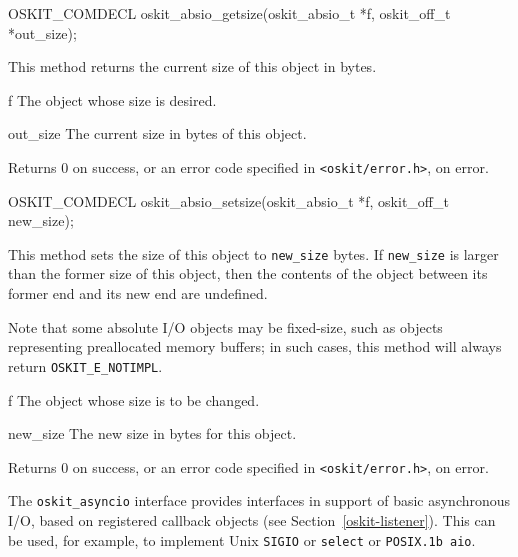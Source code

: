 \begin{apisyn}

	\funcproto OSKIT_COMDECL
	oskit_absio_getsize(oskit_absio_t *f, 
			   \outparam oskit_off_t *out_size);
\end{apisyn}
\begin{apidesc}
	This method returns the current size of this object
	in bytes. 
\end{apidesc}
\begin{apiparm}
	\item[f]
		The object whose size is desired.
	\item[out_size]
		The current size in bytes of this object.
\end{apiparm}
\begin{apiret}
	Returns 0 on success, or an error code specified in
	{\tt <oskit/error.h>}, on error.
\end{apiret}

\begin{apisyn}

	\funcproto OSKIT_COMDECL
	oskit_absio_setsize(oskit_absio_t *f, 
			   oskit_off_t new_size);
\end{apisyn}
\begin{apidesc}
	This method sets the size of this object to
	{\tt new_size} bytes.  If {\tt new_size}
	is larger than the former size of this object,
	then the contents of the object between its
	former end and its new end are undefined.

	Note that some absolute I/O objects may be fixed-size,
	such as objects representing preallocated memory buffers;
	in such cases,
	this method will always return \texttt{OSKIT_E_NOTIMPL}.
\end{apidesc}
\begin{apiparm}
	\item[f]
		The object whose size is to be changed.
	\item[new_size]
		The new size in bytes for this object.
\end{apiparm}
\begin{apiret}
	Returns 0 on success, or an error code specified in
	{\tt <oskit/error.h>}, on error.
\end{apiret}


\label{oskit-asyncio}

The {\tt oskit_asyncio} interface provides interfaces in support
of basic asynchronous I/O, based on registered callback objects
(see Section~\ref{oskit-listener}).
This can be used, for example, to implement Unix {\tt SIGIO} or {\tt select}
or {\tt POSIX.1b aio}.


